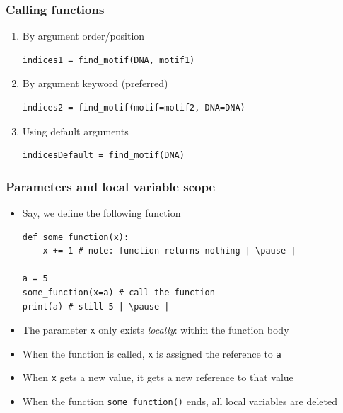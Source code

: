 \documentclass[xcolor=table]{beamer}
\begin{document}
\begin{frame}[fragile]
\frametitle{Calling functions}


\begin{enumerate}\addtolength{\itemsep}{-0.4\baselineskip}
\begin{lstlisting}[style=python]
# Example
motif1 = "ggatcc" # sequence to search for
motif2 = "aacctg" # another sequence to search for
DNA = "acgtgtaaccaaggatccacccgttttaaacctgtgtgggatcc"
\end{lstlisting}
\vspace{-0.5cm}
\item<1-> By argument order/position
\begin{lstlisting}[style=python]
indices1 = find_motif(DNA, motif1)
\end{lstlisting}

\item<2-> By argument keyword (preferred)
\begin{lstlisting}[style=python]
indices2 = find_motif(motif=motif2, DNA=DNA)
\end{lstlisting}

\item<3-> Using default arguments
\begin{lstlisting}[style=python]
indicesDefault = find_motif(DNA)
\end{lstlisting}

\end{enumerate}

\end{frame}


\begin{frame}[fragile]
\frametitle{Parameters and local variable scope}
\begin{itemize}
    \item Say, we define the following function
\begin{lstlisting}[style=python]
def some_function(x):  
    x += 1 # note: function returns nothing | \pause |

a = 5 
some_function(x=a) # call the function
print(a) # still 5 | \pause |
\end{lstlisting}
    \item The parameter \texttt{x} only exists \emph{locally}: within the function body \pause
    \item When the function is called, \texttt{x} is assigned the reference to \texttt{a} 
    \item When \texttt{x} gets a new value, it gets a new reference to that value
    \item When the function \texttt{some\_function()} ends, all local variables are deleted \pause
\end{itemize}
\end{frame}
\end{document}
